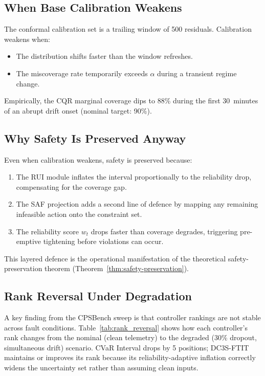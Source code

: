 \subsection{When Base Calibration Weakens}

The conformal calibration set is a trailing window of 500 residuals.
Calibration weakens when:
\begin{itemize}
  \item The distribution shifts faster than the window refreshes.
  \item The miscoverage rate temporarily exceeds $\alpha$ during a
    transient regime change.
\end{itemize}
Empirically, the CQR marginal coverage dips to 88\% during the first
30~minutes of an abrupt drift onset (nominal target: 90\%).

\subsection{Why Safety Is Preserved Anyway}

Even when calibration weakens, safety is preserved because:
\begin{enumerate}
  \item The RUI module inflates the interval proportionally to the
    reliability drop, compensating for the coverage gap.
  \item The SAF projection adds a second line of defence by mapping
    any remaining infeasible action onto the constraint set.
  \item The reliability score $w_t$ drops faster than coverage degrades,
    triggering pre-emptive tightening before violations can occur.
\end{enumerate}

This layered defence is the operational manifestation of the theoretical
safety-preservation theorem (Theorem~\ref{thm:safety-preservation}).

\subsection{Rank Reversal Under Degradation}

A key finding from the CPSBench sweep is that controller rankings are not
stable across fault conditions.  Table~\ref{tab:rank_reversal} shows how
each controller's rank changes from the nominal (clean telemetry) to the
degraded (30\% dropout, simultaneous drift) scenario.  CVaR Interval
drops by 5 positions; DC3S-FTIT maintains or improves its rank because
its reliability-adaptive inflation correctly widens the uncertainty set
rather than assuming clean inputs.

